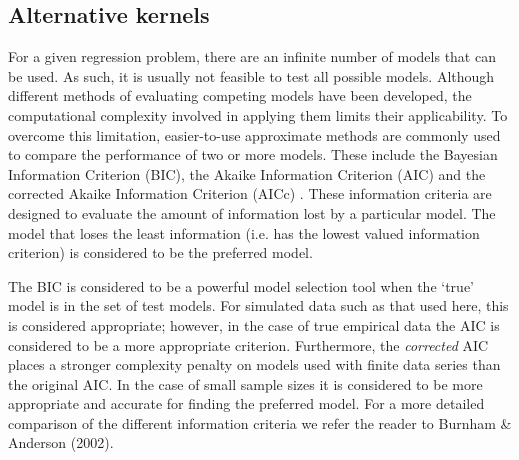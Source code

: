 \documentclass[fleqn,usenatbib]{mnras}
\begin{document}
%
%

\subsection{Alternative kernels}
\label{sec:infocrit}

For a given regression problem, there are an infinite number of models that can be used. As such, it is usually not feasible to test all possible models. Although different methods of evaluating competing models have been developed, the computational complexity involved in applying them limits their applicability. To overcome this limitation, easier-to-use approximate methods are commonly used to compare the performance of two or more models. These include the Bayesian Information Criterion (BIC), the Akaike Information Criterion (AIC) and the corrected Akaike Information Criterion (AICc) \citep{doi:10.1177/0049124104268644}. These information criteria are designed to evaluate the amount of information lost by a particular model. The model that loses the least information (i.e. has the lowest valued information criterion) is considered to be the preferred model.

The BIC is considered to be a powerful model selection tool when the `true' model is in the set of test models. For simulated data such as that used here, this is considered appropriate; however, in the case of true empirical data the AIC is considered to be a more appropriate criterion. Furthermore, the {\it corrected} AIC places a stronger complexity penalty on models used with finite data series than the original AIC. In the case of small sample sizes it is considered to be more appropriate and accurate for finding the preferred model. For a more detailed comparison of the different information criteria we refer the reader to Burnham \& Anderson (2002).
\end{document}
